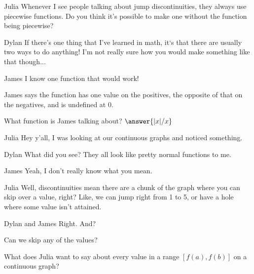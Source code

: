 \documentclass{ximera}
\begin{document}
\begin{dialogue}
\item[Julia] Whenever I see people talking about jump discontinuities, they always use piecewise functions. Do you think it's possible to make one without the function being piecewise?
\item[Dylan] If there's one thing that I've learned in math, it`s that there are usually two ways to do anything! I'm not really sure how you would make something like that though...
\item[James] I know one function that would work!
\end{dialogue}

\begin{question}
\begin{hint}
James says the function has one value on the positives, the opposite of that on the negatives, and is undefined at 0.
\end{hint}
What function is James talking about?
$\answer{|x|/x}$
\end{question}

\begin{dialogue}
\item[Julia] Hey y'all, I was looking at our continuous graphs and noticed something.
\item[Dylan] What did you see? They all look like pretty normal functions to me.
\item[James] Yeah, I don't really know what you mean.
\item[Julia] Well, discontinuities mean there are a chunk of the graph where you can skip over a value, right? Like, we can jump right from 1 to 5, or have a hole where some value isn't attained.
\item[Dylan and James] Right. And?
\end{dialogue}

\begin{question}
\begin{hint}
Can we skip any of the values?
\end{hint}
What does Julia want to say about every value in a range $[f(a),f(b)]$ on a continuous graph?
\begin{multipleChoice}
\end{multipleChoice}
\end{question}
\end{document}
